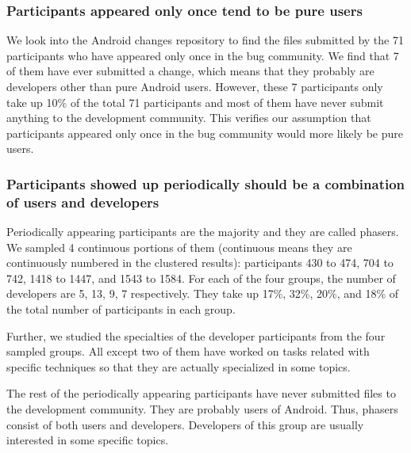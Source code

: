 \documentclass[10pt, conference, compsocconf]{IEEEtran}
\begin{document}
\subsubsection{Participants appeared only once tend to be pure users}
We look into the Android changes repository to find the files submitted by the 71 participants who have appeared only once in the bug community. We find that 7 of them have ever submitted a change, which means that they probably are developers other than pure Android users. However, these 7 participants only take up 10\% of the total 71 participants and most of them have never submit anything to the development community. This verifies our assumption that participants appeared only once in the bug community would more likely be pure users.

\subsubsection{Participants showed up periodically should be a combination of users and developers}
Periodically appearing participants are the majority and they are called phasers. We sampled 4 continuous portions of them (continuous means they are continuously numbered in the clustered results): participants 430 to 474, 704 to 742, 1418 to 1447, and 1543 to 1584. For each of the four groups, the number of developers are 5, 13, 9, 7 respectively. They take up 17\%, 32\%, 20\%, and 18\% of the total number of participants in each group. 

Further, we studied the specialties of the developer participants from the four sampled groups. All except two of them have worked on tasks related with specific techniques so that they are actually specialized in some topics. 

The rest of the periodically appearing participants have never submitted files to the development community. They are probably users of Android. Thus, phasers consist of both users and developers. Developers of this group are usually interested in some specific topics.
\end{document}
